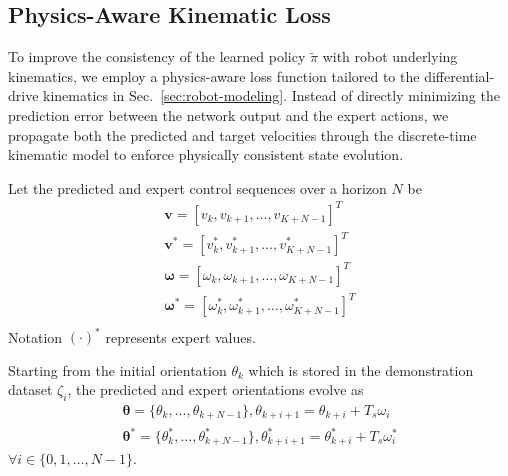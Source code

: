 \documentclass[letterpaper, 10 pt, conference]{ieeeconf}
\begin{document}
\subsection{Physics-Aware Kinematic Loss}\label{sec:phy-aware-loss}

To improve the consistency of the learned policy $\tilde{\pi}$ with robot underlying kinematics, we employ a physics-aware loss function tailored to the differential-drive kinematics in Sec.~\ref{sec:robot-modeling}. Instead of directly minimizing the prediction error between the network output and the expert actions, we propagate both the predicted and target velocities through the discrete-time kinematic model to enforce physically consistent state evolution.

Let the predicted and expert control sequences over a horizon $N$ be
\begin{equation}
  \begin{array}{c}
    \mathbf{v}=[v_k, v_{k+1}, \dots, v_{K+N-1}]^T \\
    \mathbf{v}^*=[v_k^*, v_{k+1}^*, \dots, v_{K+N-1}^*]^T \\
    \boldsymbol{\omega}=[\omega_k, \omega_{k+1}, \dots, \omega_{K+N-1}]^T\\
    \boldsymbol{\omega}^*=[\omega_k^*, \omega_{k+1}^*, \dots, \omega_{K+N-1}^*]^T\\
  \end{array}
\end{equation}
Notation $(\cdot)^*$ represents expert values.

Starting from the initial orientation $\theta_k$ which is stored in the demonstration dataset $\zeta_i$, the predicted and expert orientations evolve as
\begin{equation}
  \begin{array}{c}
    \boldsymbol{\theta}=\{\theta_k,\dots,\theta_{k+N-1}\},\theta_{k+i+1}=\theta_{k+i} + T_s\omega_i\\
    \boldsymbol{\theta}^*=\{\theta_k^*,\dots,\theta_{k+N-1}^*\}, \theta_{k+i+1}^*=\theta_{k+i}^* + T_s\omega_i^*
  \end{array}
\end{equation}
$\forall i \in \{0,1,\dots,N-1\}.$
\end{document}
